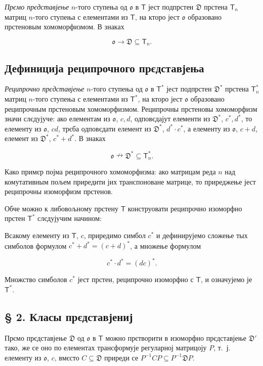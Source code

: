 \documentclass[11pt]{article}
\begin{document}
\emph{Прємо прєдставјење} \(n\)-того ступења од \(\mathfrak{o}\) в \(\mathsf T\) јест подпрстен \(\mathfrak D\) прстена \(\mathsf T_n\) матриц \(n\)-того ступења с елементами из \(\mathsf T\), на кторо јест \(\mathfrak{o}\) образовано прстеновым хомоморфизмом. В знаках

\[
\mathfrak{o}\to\mathfrak D\subseteq\mathsf T_n.
\]

\subsection*{Дефиниција реципрочного прєдставјења}\label{definition-der-reziproken-darstellung}

\emph{Реципрочно прєдставјење} \(n\)-того ступења од \(\mathfrak{o}\) в \(\mathsf T^*\) јест подпрстен \(\mathfrak D^*\) прстена \(\mathsf T_n^*\) матриц \(n\)-того ступења с елементами из \(\mathsf T^*\), на кторо јест \(\mathfrak{o}\) образовано реципрочным прстеновым хомоморфизмом. Реципрочны прстеновы хомоморфизм значи слєдујуче: ако елементам из \(\mathfrak{o}\), \(c,d\), одповєдајут елементи из \(\mathfrak D^*\), \(c^*,d^*\), то елементу из \(\mathfrak{o}\), \(cd\), трєба одповєдати елемент из \(\mathfrak D^*\), \(d^*\cdot c^*\), а елементу из \(\mathfrak{o}\), \(c+d\), елемент из \(\mathfrak D^*\), \(c^*+d^*\). В знаках

\[
\mathfrak{o}\nrightarrow\mathfrak D^*\subseteq\mathsf T_n^*.
\]

Како примєр појма реципрочного хомоморфизма: ако матрицам реда \(n\) над комутативным пољем приредити јих транспоноване матрице, то приреджење јест реципрочны изоморфизм прстенов.

Обче можно к либовољному прстену \(\mathsf T\) конструовати реципрочно изоморфно прстен \(\mathsf T^*\) слєдујучим начином:

Всакому елементу из \(\mathsf T\), \(c\), приредимо симбол \(c^*\) и дефинирујемо сложење тых симболов формулом \(c^*+d^*=(c+d)^*\), а множење формулом

\[
c^*\cdot d^*=(dc)^*.
\]

Множство симболов \(c^*\) јест прстен, реципрочно изоморфно с \(\mathsf T\), и означујемо је \(\mathsf T^*\).

\subsection*{§ 2. Класы прєдставјениј}\label{darstellungsklassen}

Прємо прєдставјење \(\mathfrak D\) од \(\mathfrak{o}\) в \(\mathsf T\) можно прєтворити в изоморфно прєдставјење \(\mathfrak D'\) тако, же се оно по елементах трансформује регуларној матрицоју \(P\), т.~ј. елементу из \(\mathfrak{o}\), \(c\), вмєсто \(C\subseteq\mathfrak D\) приреди се \(P^{-1}CP\subseteq P^{-1}\mathfrak D P\).
\end{document}
